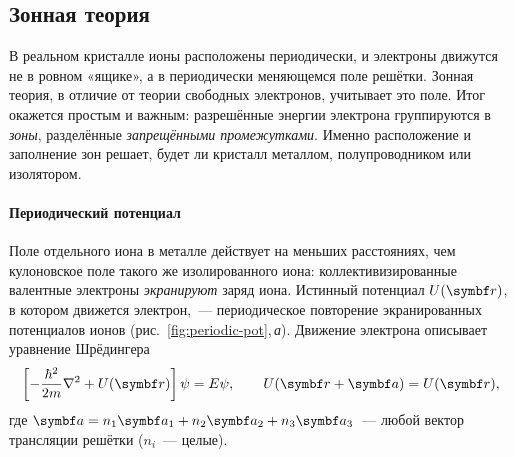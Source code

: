\subsection{Зонная теория}\label{ssec:bands}

В реальном кристалле ионы расположены периодически, и электроны движутся
не в ровном «ящике», а в периодически меняющемся поле решётки. Зонная
теория, в отличие от теории свободных электронов, учитывает это поле.
Итог окажется простым и важным: разрешённые энергии электрона
группируются в \emph{зоны}, разделённые \emph{запрещёнными промежутками}.
Именно расположение и заполнение зон решает, будет ли кристалл металлом,
полупроводником или изолятором.

\paragraph{Периодический потенциал}
Поле отдельного иона в металле действует на меньших расстояниях, чем
кулоновское поле такого же изолированного иона: коллективизированные
валентные электроны \emph{экранируют} заряд иона. Истинный потенциал
$U(\vb r)$, в котором движется электрон,~— периодическое повторение
экранированных потенциалов ионов (рис.~\ref{fig:periodic-pot},\,\textit{а}).
Движение электрона описывает уравнение Шрёдингера
\begin{equation}\label{eq:schr-crystal}
\left[-\frac{\hbar^2}{2m}\nabla^2+U(\vb r)\right]\psi=E\psi,
\qquad U(\vb r+\vb a)=U(\vb r),
\end{equation}
где $\vb a=n_1\vb a_1+n_2\vb a_2+n_3\vb a_3$~— любой вектор трансляции
решётки ($n_i$~— целые).

